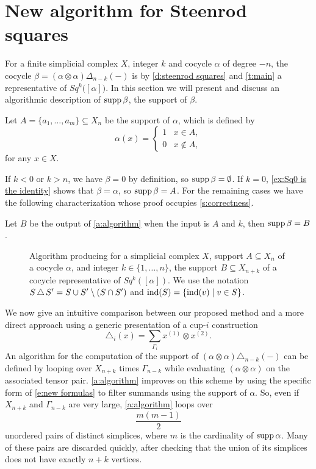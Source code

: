 
\section{New algorithm for Steenrod squares} \label{s:algorithm}

For a finite simplicial complex $X$, integer $k$ and cocycle $\alpha$ of degree $-n$, the cocycle $\beta = (\alpha \otimes \alpha)\Delta_{n-k}(-)$ is by
\cref{d:steenrod squares} and \cref{t:main} a representative of $Sq^k \big( [\alpha] \big)$.
In this section we will present and discuss an algorithmic description of $\operatorname{supp} \beta$, the support of $\beta$.

Let $A = \{a_1, \dots, a_m\} \subseteq X_n$ be the support of $\alpha$, which is defined by
\[
\alpha(x) = \begin{cases}
1 & x \in A, \\ 0 & x \not\in A,
\end{cases}
\]
for any $x \in X$.

If $k < 0$ or $k > n$, we have $\beta = 0$ by definition,
so $\operatorname{supp} \beta = \emptyset$.
If $k = 0$, \cref{ex:Sq0 is the identity} shows that $\beta = \alpha$, so $\operatorname{supp} \beta = A$.
For the remaining cases we have the following characterization whose proof occupies \cref{s:correctness}.

\begin{theorem} \label{t:algorithm}
	Let $B$ be the output of \cref{a:algorithm} when the input is $A$ and $k$, then $\operatorname{supp} \beta = B$.
\end{theorem}

\begin{figure}
	
	\caption{Algorithm producing for a simplicial complex $X$, support $A \subseteq X_n$ of a cocycle $\alpha$, and integer $k \in \{1, \dots, n\}$, the support $B \subseteq X_{n+k}$ of a cocycle representative of $Sq^k([\alpha])$.
	We use the notation $S \operatorname{\triangle} S^\prime = S \cup S^\prime \setminus (S \cap S^\prime)$ and $\mathrm{ind}(S) = \{\mathrm{ind}(v) \mid v \in S\}$.}
	\label{f:algorithm}
\end{figure}

We now give an intuitive comparison between our proposed method and a more direct approach using a generic presentation of a cup-$i$ construction
\[
\triangle_i(x) =
\sum_{\Gamma_i} x^{(1)} \otimes x^{(2)}.
\]
An algorithm for the computation of the support of $(\alpha \otimes \alpha)\triangle_{n-k}(-)$ can be defined by looping over $X_{n+k}$ times $\Gamma_{n-k}$ while evaluating $(\alpha \otimes \alpha)$ on the associated tensor pair.
\cref{a:algorithm} improves on this scheme by using the specific form of \eqref{e:new formulas} to filter summands using the support of $\alpha$.
So, even if $X_{n+k}$ and $\Gamma_{n-k}$ are very large, \cref{a:algorithm} loops over
\[
\frac{m(m-1)}{2}
\]
unordered pairs of distinct simplices, where $m$ is the cardinality of $\operatorname{supp} \alpha$.
Many of these pairs are discarded quickly, after checking that the union of its simplices does not have exactly $n+k$ vertices.

